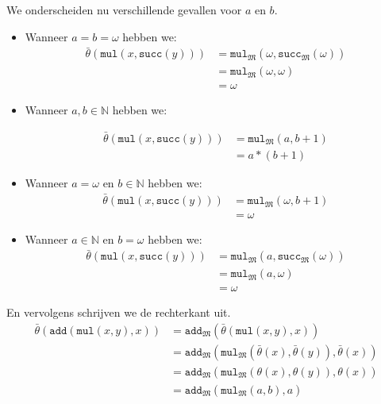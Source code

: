 \documentclass[a4paper,11pt]{article}
\begin{document}
\begin{itemize}
We onderscheiden nu verschillende gevallen voor $a$ en $b$.

\begin{itemize}

\item
Wanneer $a = b = \omega$ hebben we:
\begin{align*}
\bar \theta(\texttt{mul}(x,\texttt{succ}(y))) &= \texttt{mul}_{\mathfrak{M}}(\omega, \texttt{succ}_{\mathfrak{M}}(\omega)) \\
                                              &= \texttt{mul}_{\mathfrak{M}}(\omega, \omega) \\
                                              &= \omega
\end{align*}

\item
Wanneer $a,b \in \mathbb{N}$ hebben we:

\begin{align*}
\bar \theta(\texttt{mul}(x,\texttt{succ}(y))) &= \texttt{mul}_{\mathfrak{M}}(a, b+1) \\
                                              &= a*(b+1)
\end{align*}

\item
Wanneer $a = \omega$ en $b \in \mathbb{N}$ hebben we:
\begin{align*}
\bar \theta(\texttt{mul}(x,\texttt{succ}(y))) &= \texttt{mul}_{\mathfrak{M}}(\omega, b+1) \\
                                              &= \omega
\end{align*}

\item
Wanneer $a \in \mathbb{N}$ en $b = \omega$ hebben we:
\begin{align*}
\bar \theta(\texttt{mul}(x,\texttt{succ}(y))) &= \texttt{mul}_{\mathfrak{M}}(a, \texttt{succ}_{\mathfrak{M}}(\omega)) \\
                                              &= \texttt{mul}_{\mathfrak{M}}(a, \omega) \\
                                              &= \omega
\end{align*}

\end{itemize}

En vervolgens schrijven we de rechterkant uit.
\begin{align*}
\bar \theta(\texttt{add}(\texttt{mul}(x,y),x)) &= \texttt{add}_{\mathfrak{M}}(\bar \theta(\texttt{mul}(x,y),x)) \\
                                               &= \texttt{add}_{\mathfrak{M}}(\texttt{mul}_{\mathfrak{M}}(\bar \theta(x),\bar \theta(y)),\bar \theta(x)) \\
                                               &= \texttt{add}_{\mathfrak{M}}(\texttt{mul}_{\mathfrak{M}}(\theta(x),\theta(y)),\theta(x)) \\
                                               &= \texttt{add}_{\mathfrak{M}}(\texttt{mul}_{\mathfrak{M}}(a,b),a)
\end{align*}


\end{itemize}
\end{document}
